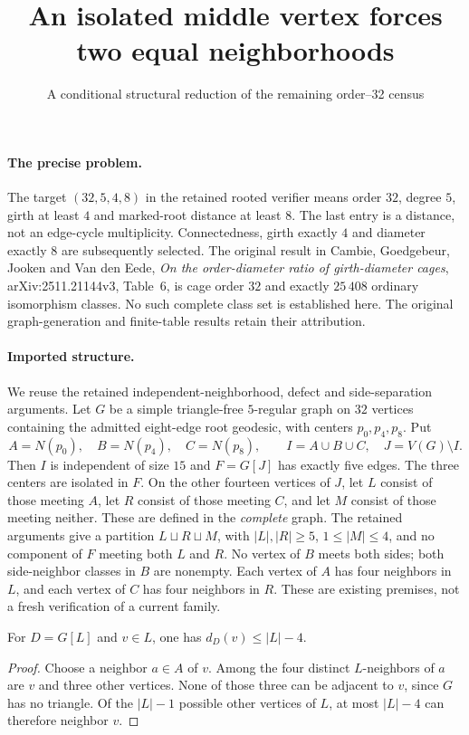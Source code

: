 \documentclass[11pt]{article}
\title{An isolated middle vertex forces two equal neighborhoods}
\author{A conditional structural reduction of the remaining order--32 census}
\date{}
\begin{document}
\maketitle

\paragraph{The precise problem.}
The target $(32,5,4,8)$ in the retained rooted verifier means order $32$,
degree $5$, girth at least $4$ and marked-root distance at least $8$.
The last entry is a distance, not an edge-cycle multiplicity.
Connectedness, girth exactly $4$ and diameter exactly $8$ are subsequently
selected. The original result in Cambie, Goedgebeur, Jooken and Van den Eede,
\emph{On the order-diameter ratio of girth-diameter cages},
arXiv:2511.21144v3, Table~6, is cage order $32$ and exactly $25\,408$
ordinary isomorphism classes. No such complete class set is established here.
The original graph-generation and finite-table results retain their attribution.

\paragraph{Imported structure.}
We reuse the retained independent-neighborhood, defect and side-separation
arguments. Let $G$ be a simple triangle-free $5$-regular graph on $32$
vertices containing the admitted eight-edge root geodesic, with centers
$p_0,p_4,p_8$. Put
\[
 A=N(p_0),\quad B=N(p_4),\quad C=N(p_8),\qquad
 I=A\cup B\cup C,\quad J=V(G)\setminus I.
\]
Then $I$ is independent of size $15$ and $F=G[J]$ has exactly five edges.
The three centers are isolated in $F$. On the other fourteen vertices of
$J$, let $L$ consist of those meeting $A$, let $R$ consist of those meeting
$C$, and let $M$ consist of those meeting neither. These are defined in the
\emph{complete} graph. The retained arguments give a partition
$L\sqcup R\sqcup M$, with $|L|,|R|\geq5$, $1\leq |M|\leq4$, and no
component of $F$ meeting both $L$ and $R$. No vertex of $B$ meets both
sides; both side-neighbor classes in $B$ are nonempty. Each vertex of $A$
has four neighbors in $L$, and each vertex of $C$ has four neighbors in $R$.
These are existing premises, not a fresh verification of a current family.

\begin{lemma}\label{small}
For $D=G[L]$ and $v\in L$, one has $d_D(v)\leq |L|-4$.
\end{lemma}
\begin{proof}
Choose a neighbor $a\in A$ of $v$. Among the four distinct $L$-neighbors
of $a$ are $v$ and three other vertices. None of those three can be
adjacent to $v$, since $G$ has no triangle. Of the $|L|-1$ possible
other vertices of $L$, at most $|L|-4$ can therefore neighbor $v$.
\end{proof}
\end{document}
